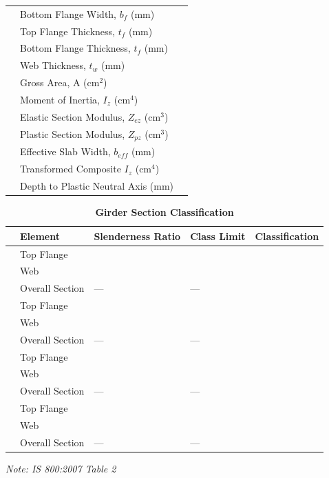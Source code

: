\documentclass[12pt,a4paper]{report}
\numberwithin{table}{chapter}
\numberwithin{figure}{chapter}
\begin{document}
\begin{longtable}{|C{2.5cm}|L{8.0cm}|>{\centering\arraybackslash}p{5.0cm}|}
 & \textnormal{Bottom Flange Width, $b_f$ (mm)} &  \\[6pt]
 & \textnormal{Top Flange Thickness, $t_f$ (mm)} &  \\[6pt]
 & \textnormal{Bottom Flange Thickness, $t_f$ (mm)} &  \\[6pt]
 & \textnormal{Web Thickness, $t_w$ (mm)} &  \\[6pt]
 & \textnormal{Gross Area, A (cm$^2$)} &  \\[6pt]
 & \textnormal{Moment of Inertia, $I_z$ (cm$^4$)} &  \\[6pt]
 & \textnormal{Elastic Section Modulus, $Z_{ez}$ (cm$^3$)} &  \\[6pt]
 & \textnormal{Plastic Section Modulus, $Z_{pz}$ (cm$^3$)} &  \\[6pt]
 & \textnormal{Effective Slab Width, $b_{eff}$ (mm)} &  \\[6pt]
 & \textnormal{Transformed Composite $I_z$ (cm$^4$)} &  \\[6pt]
 & \textnormal{Depth to Plastic Neutral Axis (mm)} &  \\[6pt]
\hline
\end{longtable}

\vspace{1em}
\begin{longtable}{|C{2.5cm}|L{3cm}|C{3.5cm}|C{2.5cm}|>{\centering\arraybackslash}p{4.0cm}|}
\caption{\textbf{Girder Section Classification}} \\
\hline
\textbf{} & \textbf{Element} & \textbf{Slenderness Ratio} & \textbf{Class Limit} & \textbf{Classification} \\[6pt]
\hline
{} & Top Flange &  &  &  \\[6pt]
 & Web &  &  &  \\[6pt]
 & Overall Section & --- & --- &  \\[6pt]
\hline
{} & Top Flange &  &  &  \\[6pt]
 & Web &  &  &  \\[6pt]
 & Overall Section & --- & --- &  \\[6pt]
\hline
{} & Top Flange &  &  &  \\[6pt]
 & Web &  &  &  \\[6pt]
 & Overall Section & --- & --- &  \\[6pt]
\hline
{} & Top Flange &  &  &  \\[6pt]
 & Web &  &  &  \\[6pt]
 & Overall Section & --- & --- &  \\[6pt]
\hline
\end{longtable}
\noindent\textit{Note: IS 800:2007 Table 2}
\end{document}
